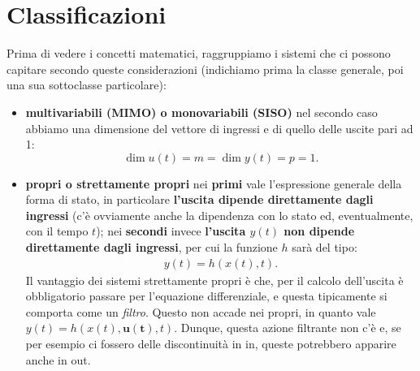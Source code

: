 \documentclass[a4paper]{report}
\begin{document}
\section{Classificazioni}
Prima di vedere i concetti matematici, raggruppiamo i sistemi che ci possono capitare secondo queste considerazioni (indichiamo prima la classe generale, poi una sua sottoclasse particolare):
\begin{itemize}
	\item \textbf{multivariabili (MIMO) o monovariabili (SISO)} \rarr nel secondo caso abbiamo una dimensione del vettore di ingressi e di quello delle uscite pari ad 1: $$ \dim{u(t)} = m = \dim{y(t)} = p = 1.$$ 
	\item \textbf{propri o strettamente propri} \rarr nei \textbf{primi} vale l'espressione generale della forma di stato, in particolare \textbf{l'uscita dipende direttamente dagli ingressi} (c'è ovviamente anche la dipendenza con lo stato ed, eventualmente, con il tempo $t$); nei \textbf{secondi} invece \textbf{l'uscita $y(t)$ non dipende direttamente dagli ingressi}, per cui la funzione $h$ sarà del tipo:
	\begin{align*}
		y(t) = h(x(t),t).
	\end{align*}
	Il vantaggio dei sistemi strettamente propri è che, per il calcolo dell'uscita è obbligatorio passare per l'equazione differenziale, e questa tipicamente si comporta come un \textit{filtro}. Questo non accade nei propri, in quanto vale $y(t) = h(x(t), \mathbf{u(t)}, t)$. Dunque, questa azione filtrante non c'è e, se per esempio ci fossero delle discontinuità in in, queste potrebbero apparire anche in out.
	
\end{itemize}
\end{document}
